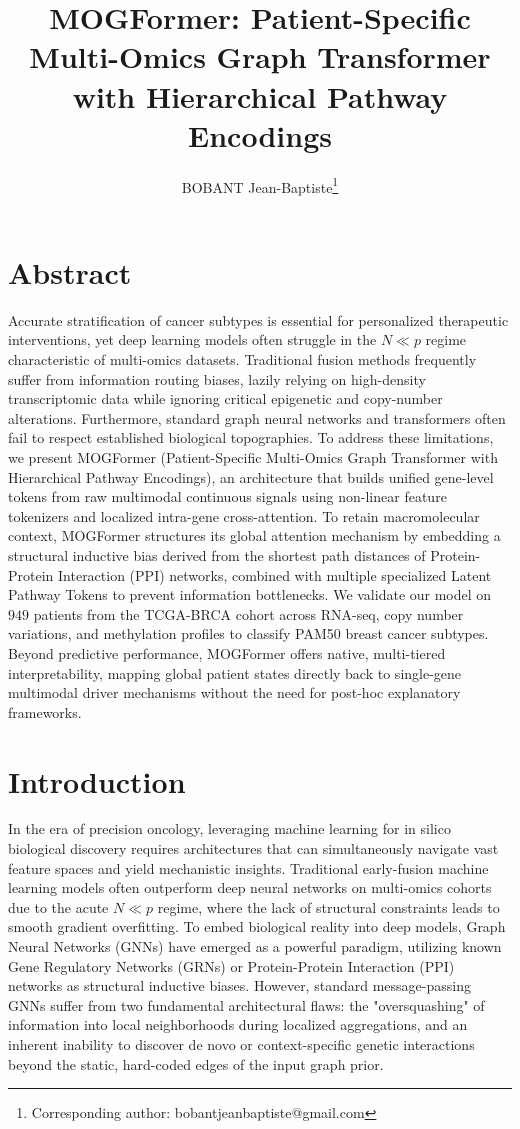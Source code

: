 \documentclass[10pt, twocolumn]{article}
\title{\vspace{-1.5cm} \textbf{MOGFormer: Patient-Specific Multi-Omics Graph Transformer with Hierarchical Pathway Encodings}}
\author[1]{BOBANT Jean-Baptiste\thanks{Corresponding author: bobantjeanbaptiste@gmail.com}}
\affil[1]{\small CentraleSupélec, Paris-Saclay University, France}
\date{}
\begin{document}
\maketitle

\section*{Abstract}
Accurate stratification of cancer subtypes is essential for personalized therapeutic interventions, yet deep learning models often struggle in the $N \ll p$ regime characteristic of multi-omics datasets. Traditional fusion methods frequently suffer from information routing biases, lazily relying on high-density transcriptomic data while ignoring critical epigenetic and copy-number alterations. Furthermore, standard graph neural networks and transformers often fail to respect established biological topographies. To address these limitations, we present MOGFormer (Patient-Specific Multi-Omics Graph Transformer with Hierarchical Pathway Encodings), an architecture that builds unified gene-level tokens from raw multimodal continuous signals using non-linear feature tokenizers and localized intra-gene cross-attention. To retain macromolecular context, MOGFormer structures its global attention mechanism by embedding a structural inductive bias derived from the shortest path distances of Protein-Protein Interaction (PPI) networks, combined with multiple specialized Latent Pathway Tokens to prevent information bottlenecks. We validate our model on $949$ patients from the TCGA-BRCA cohort across RNA-seq, copy number variations, and methylation profiles to classify PAM50 breast cancer subtypes. Beyond predictive performance, MOGFormer offers native, multi-tiered interpretability, mapping global patient states directly back to single-gene multimodal driver mechanisms without the need for post-hoc explanatory frameworks.



\section*{Introduction}

In the era of precision oncology, leveraging machine learning for in silico biological discovery requires architectures that can simultaneously navigate vast feature spaces and yield mechanistic insights. Traditional early-fusion machine learning models often outperform deep neural networks on multi-omics cohorts due to the acute $N \ll p$ regime, where the lack of structural constraints leads to smooth gradient overfitting. To embed biological reality into deep models, Graph Neural Networks (GNNs) have emerged as a powerful paradigm, utilizing known Gene Regulatory Networks (GRNs) or Protein-Protein Interaction (PPI) networks as structural inductive biases. However, standard message-passing GNNs suffer from two fundamental architectural flaws: the "oversquashing" of information into local neighborhoods during localized aggregations, and an inherent inability to discover de novo or context-specific genetic interactions beyond the static, hard-coded edges of the input graph prior.
\end{document}
